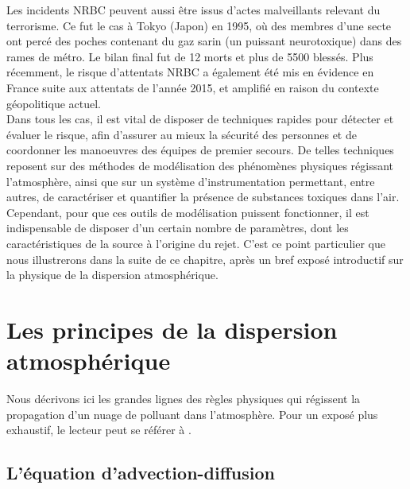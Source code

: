 	Les incidents NRBC peuvent aussi être issus d'actes malveillants relevant du terrorisme. Ce fut le cas à Tokyo (Japon) en 1995, où des membres d'une secte ont percé des poches contenant du gaz sarin (un puissant neurotoxique) dans des rames de métro. Le bilan final {fut}  de 12 morts et plus de 5500 blessés. Plus récemment, le risque d'attentats NRBC a également été mis en évidence  en France suite aux attentats de l'année 2015, et amplifié en raison du contexte géopolitique actuel.\\
	
	Dans tous les cas, il est vital de disposer de techniques rapides pour détecter et évaluer le risque, afin d'assurer au mieux la sécurité des personnes et de coordonner les manoeuvres des équipes de premier secours. De telles techniques reposent sur des méthodes de modélisation des phénomènes physiques régissant l'atmosphère, ainsi que sur un système d'instrumentation permettant, entre autres, de caractériser et quantifier la présence de substances toxiques dans l'air.\\
	
	Cependant, pour que ces outils de modélisation puissent fonctionner, il est indispensable de disposer d'un certain nombre de paramètres, dont les caractéristiques de la source à l'origine du rejet. C'est ce point particulier que nous illustrerons dans la suite de ce chapitre, après un bref exposé introductif sur la physique de la dispersion atmosphérique.\\


	\section{Les principes de la dispersion atmosphérique}
	
	Nous décrivons ici les grandes lignes des règles physiques qui régissent la propagation d'un nuage de polluant dans l'atmosphère. Pour un exposé plus exhaustif, le lecteur peut se référer à \cite{Sportisse2008}.
	
	\subsection{L'équation d'advection-diffusion}
	
